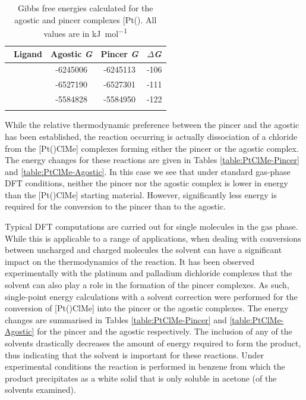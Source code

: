 \begin{table}[htp]
\caption[Gibbs free energies calculated for agostic and pincer [Pt(\tBuxantphos)\ce{Me{]}+}]{Gibbs free energies calculated for the agostic and pincer complexes [Pt(\tBuxantphosk)\ce{Me]+}.  All values are in \si{\kilo\joule\per\mole}}
\vspace{1em}
\label{table:PtMeenergies}
\small
\begin{center}
\begin{tabular}{l c c c}
	\toprule
	~\bfseries{Ligand} & \bfseries{Agostic \emph{G}} & \bfseries{Pincer \emph{G}} & \bfseries{$\Delta$\emph{G}} \\
	\midrule		
	~\tBuSixantphos	& -6245006	& -6245113 	& -106 \\
	~\tBuThixantphos	& -6527190	& -6527301	& -111 \\
	~\tBuXantphos		& -5584828	& -5584950	& -122 \\ 
	\bottomrule{}
\end{tabular}
\end{center}
\end{table}

While the relative thermodynamic preference between the pincer and the agostic has been established, the reaction occurring is actually dissociation of a chloride from the [Pt(\tBuxantphos)ClMe] complexes forming either the pincer or the agostic complex.  The energy changes for these reactions are given in Tables \ref{table:PtClMe-Pincer} and \ref{table:PtClMe-Agostic}.  In this case we see that under standard gas-phase \gls{DFT} conditions, neither the pincer nor the agostic complex is lower in energy than the [Pt(\tBuxantphos)ClMe] starting material.  However, significantly less energy is required for the conversion to the pincer than to the agostic.  

Typical DFT computations are carried out for single molecules in the gas phase.  While this is applicable to a range of applications, when dealing with conversions between uncharged and charged molecules the solvent can have a significant impact on the thermodynamics of the reaction.  It has been observed experimentally with the platinum and palladium dichloride complexes that the solvent can also play a role in the formation of the pincer complexes.  As such, single-point energy calculations with a solvent correction were performed for the conversion of [Pt(\tBuxantphos)ClMe] into the pincer or the agostic complexes.  The energy changes are summarised in Tables \ref{table:PtClMe-Pincer} and \ref{table:PtClMe-Agostic} for the pincer and the agostic respectively.  The inclusion of any of the solvents drastically decreases the amount of energy required to form the product, thus indicating that the solvent is important for these reactions.  Under experimental conditions the reaction is performed in benzene from which the product precipitates as a white solid that is only soluble in acetone (of the solvents examined).  

